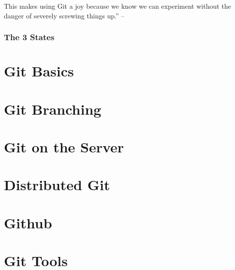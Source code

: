 \documentclass[oneside]{book}
\numberwithin{equation}{section}
\begin{document}
This makes using Git a joy because we know we can experiment without the danger of severely screwing things up.'' -- \cite[p. 7]{Chacon_Straub2014}

\subsubsection{The 3 States}


\section{Git Basics}


\section{Git Branching}


\section{Git on the Server}


\section{Distributed Git}


\section{Github}


\section{Git Tools}

\end{document}
